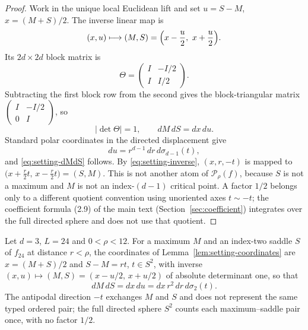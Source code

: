 \begin{proof}
Work in the unique local Euclidean lift and set $u=S-M$, $x=(M+S)/2$. The inverse linear map is
\begin{equation}\label{eq:setting-linear}
(x,u)\longmapsto(M,S)=\Bigl(x-\frac u2,\ x+\frac u2\Bigr).
\end{equation}
Its $2d\times2d$ block matrix is
\begin{equation}\label{eq:setting-Theta}
\Theta=\begin{pmatrix}I&-I/2\\ I&I/2\end{pmatrix}.
\end{equation}
Subtracting the first block row from the second gives the block-triangular matrix $\left(\begin{smallmatrix}I&-I/2\\0&I\end{smallmatrix}\right)$, so
\begin{equation}\label{eq:setting-detone}
|\det\Theta|=1,\qquad dM\,dS=dx\,du .
\end{equation}
Standard polar coordinates in the directed displacement give
\begin{equation}\label{eq:setting-polar}
du=r^{d-1}\,dr\,d\sigma_{d-1}(t),
\end{equation}
and \eqref{eq:setting-dMdS} follows. By \eqref{eq:setting-inverse}, $(x,r,-t)$ is mapped to $\bigl(x+\frac r2t,\,x-\frac r2t\bigr)=(S,M)$. This is not another atom of $\mathcal P_\rho(f)$, because $S$ is not a maximum and $M$ is not an index-$(d-1)$ critical point. A factor $1/2$ belongs only to a different quotient convention using unoriented axes $t\sim-t$; the coefficient formula (2.9) of the main text (Section~\ref{sec:coefficient}) integrates over the full directed sphere and does not use that quotient.
\end{proof}

\begin{corollary}\label{cor:setting-d3}
Let $d=3$, $L=24$ and $0<\rho<12$. For a maximum $M$ and an index-two saddle $S$ of $f_{24}$ at distance $r<\rho$, the coordinates of Lemma~\ref{lem:setting-coordinates} are $x=(M+S)/2$ and $S-M=rt$, $t\in S^2$, with inverse $(x,u)\mapsto(M,S)=(x-u/2,\,x+u/2)$ of absolute determinant one, so that
\begin{equation}\label{eq:setting-dMdS3}
dM\,dS=dx\,du=dx\,r^2\,dr\,d\sigma_2(t).
\end{equation}
The antipodal direction $-t$ exchanges $M$ and $S$ and does not represent the same typed ordered pair; the full directed sphere $S^2$ counts each maximum--saddle pair once, with no factor $1/2$.
\end{corollary}

